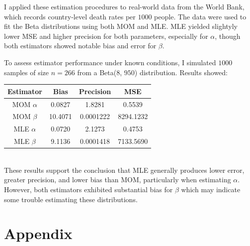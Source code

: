 \documentclass{article}\usepackage[]{graphicx}\usepackage[]{xcolor}
\begin{document}
\begin{multicols}{2}
\indent I applied these estimation procedures to real-world data from the World Bank, which records country-level death rates per $1000$ people. The data were used to fit the Beta distributions using both MOM and MLE. MLE yielded slightyly lower MSE and higher precision for both parameters, especially for $\alpha$, though both estimators showed notable bias and error for $\beta$.

To assess estimator performance under known conditions, I simulated $1000$ samples of size $n = 266$ from a Beta($8$, $950$) distribution. Results showed:
\begin{tabular}{|c|c|c|c|}
\hline
Estimator & Bias & Precision & MSE \\
\hline
MOM $\alpha$ & 0.0827 & 1.8281 & 0.5539 \\
MOM $\beta$ & 10.4071 & 0.0001222 & 8294.1232 \\
MLE $\alpha$ & 0.0720 & 2.1273 & 0.4753 \\
MLE $\beta$ & 9.1136 & 0.0001418 & 7133.5690 \\
\hline
\end{tabular}\\
These results support the conclusion that MLE generally produces lower error, greater precision, and lower bias than MOM, particularly when estimating $\alpha$. However, both estimators exhibited substantial bias for $\beta$ which may indicate some trouble estimating these distributions.

\vspace{2em}

\citep{patch}

\begin{tiny}

\end{tiny}
\end{multicols}

\newpage
\onecolumn
\section{Appendix}
\end{document}
